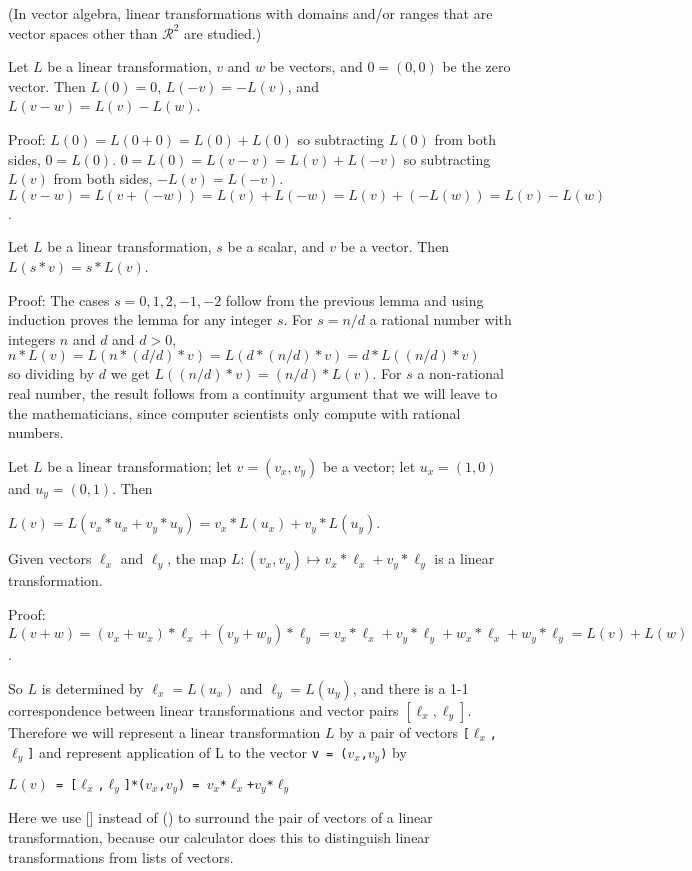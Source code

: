 \documentclass[12pt]{article}
\begin{document}
(In vector algebra, linear transformations with domains and/or ranges
that are vector spaces other than $\mathcal{R}^2$ are studied.)


\begin{lemma}
Let $L$ be a linear transformation, $v$ and $w$ be vectors,
and $0=(0,0)$ be the zero vector.  Then $L(0)=0$,  $L(-v)=-L(v)$,
and $L(v-w) = L(v) - L(w)$.
\end{lemma}
\begin{indpar}{0.5in}
Proof: $L(0) = L(0+0)= L(0) + L(0)$ so subtracting $L(0)$
from both sides, $0=L(0)$.  $0 = L(0) = L(v-v) = L(v) + L(-v)$
so subtracting $L(v)$ from both sides, $-L(v)=L(-v)$.
$L(v-w)=L(v+(-w))=L(v)+L(-w)=L(v)+(-L(w))=L(v)-L(w)$.
\end{indpar}

\begin{lemma}
Let $L$ be a linear transformation, $s$ be a scalar, and $v$ be a vector.
Then $L(s*v)=s*L(v)$.
\end{lemma}
\begin{indpar}{0.5in}
Proof: The cases $s=0,1,2,-1,-2$ follow from the previous lemma and
using induction proves the lemma for any integer $s$.  For $s=n/d$
a rational number with integers $n$ and $d$ and $d>0$, \\
\hspace*{0.1in}$n*L(v) = L(n*(d/d)*v) = L(d*(n/d)*v)=d*L((n/d)*v)$ \\
so dividing by $d$
we get $L((n/d)*v)=(n/d)*L(v)$.  For $s$ a non-rational real number,
the result follows from a continuity argument that we will leave
to the mathematicians, since computer scientists only compute
with rational numbers.
\end{indpar}

Let $L$ be a linear transformation; let $v=(v_x,v_y)$ be a vector;
let $u_x=(1,0)$ and $u_y =(0,1)$.  Then \\
\centerline{$L(v) = L(v_x*u_x+v_y*u_y)=v_x*L(u_x)+v_y*L(u_y)$.}

\begin{lemma}
Given vectors $\ell_x$ and $\ell_y$, the map
$L:(v_x,v_y)\longmapsto v_x*\ell_x+v_y*\ell_y$ is a linear
transformation.
\end{lemma}
\begin{indpar}{0.5in}
Proof: $L(v+w) = (v_x+w_x)*\ell_x+(v_y+w_y)*\ell_y
               = v_x*\ell_x+v_y*\ell_y+w_x*\ell_x+w_y*\ell_y
	       = L(v) + L(w)$.
\end{indpar}

So $L$ is determined by $\ell_x = L(u_x)$ and $\ell_y = L(u_y)$,
and there is a 1-1 correspondence between linear transformations
and vector pairs $[\ell_x,\ell_y]$.  Therefore we will represent a linear
transformation $L$ by a pair of vectors {\tt [$\ell_x$,$\ell_y$]}
and represent application of L to the vector {\tt v = ($v_x$,$v_y$)} by \\
\centerline{\tt $L(v)$ = [$\ell_x$,$\ell_y$]*($v_x$,$v_y$) =
             $v_x$*$\ell_x$+$v_y$*$\ell_y$}
Here we use [] instead of () to surround the pair of vectors of a linear
transformation, because our calculator does this to distinguish linear
transformations from lists of vectors.
\end{document}
